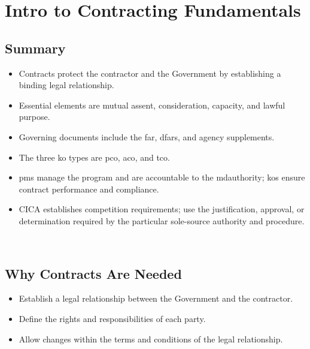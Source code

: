 \documentclass[../main.tex]{subfiles}
\begin{document}

\section{Intro to Contracting Fundamentals}

\subsection{Summary}
\begin{itemize}
  \item Contracts protect the contractor and the Government by establishing a binding legal relationship.
  \item Essential elements are mutual assent, consideration, capacity, and lawful purpose.
  \item Governing documents include the \ac{far}, \ac{dfars}, and agency supplements.
  \item The three \ac{ko} types are \ac{pco}, \ac{aco}, and \ac{tco}.
  \item \acp{pm} manage the program and are accountable to the \ac{mdauthority}; \acp{ko} ensure contract performance and compliance.
  \item CICA establishes competition requirements; use the justification, approval, or determination required by the particular sole-source authority and procedure.
\end{itemize}
~\autocite{edo-3-2-1-intro-contracting-2025}

\subsection{Why Contracts Are Needed}
\begin{itemize}
  \item Establish a legal relationship between the Government and the contractor.
  \item Define the rights and responsibilities of each party.
  \item Allow changes within the terms and conditions of the legal relationship.
\end{itemize}
\end{document}
